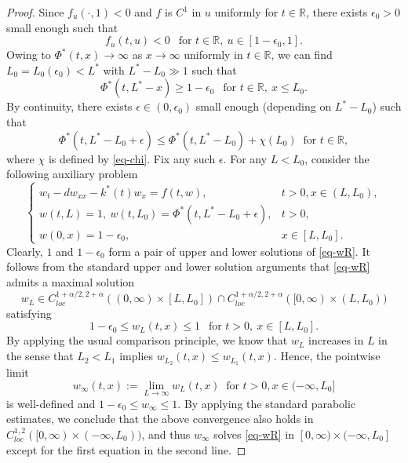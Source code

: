 \documentclass[10pt,a4paper]{amsart}
\begin{document}
\begin{proof}
Since $f_u(\cdot,1)<0$ and $f$ is $C^1$ in $u$ uniformly for $t\in\mathbb R$,  there exists $\epsilon_0>0$ small enough such that  
\begin{equation}\label{eq-f_u}
  f_u(t,u)<0 ~~\text{ for }t\in\mathbb{R},\ u\in[1-\epsilon_0,1].
\end{equation} 
Owing to $\Phi^*(t,x) \to\infty$ as $x\to\infty$ uniformly in $t\in\mathbb R$,   we can find $L_0=L_0(\epsilon_0)<L^*$ with $L^*-L_0\gg 1$  such that 
\begin{equation}\label{eq-pl1}
  \Phi^*(t,L^*-x)\geq 1-\epsilon_0 ~~\text{ for }t\in\mathbb{R},\ x\leq L_0.
\end{equation}
By continuity,  there exists  $\epsilon\in(0,\epsilon_0)$ small enough (depending on $L^*-L_0$) such that
\begin{equation}\label{eq-pchi}
  \Phi^*(t,L^*-L_0+\epsilon)\leq \Phi^*(t,L^*-L_0)+\chi(L_0)~ \text{ for }t\in\mathbb R,
\end{equation}
where $\chi$ is defined by \eqref{eq-chi}.
Fix any such  $\epsilon$. For any $L<L_0$, consider the following auxiliary problem 
\begin{equation}\label{eq-wR}
  \begin{cases}
    w_t-dw_{xx}-k^*(t)w_x=f(t,w), &t>0, x\in(L,L_0),\\
    w(t,L)=1, ~w(t,L_0)=\Phi^*(t,L^*-L_0+\epsilon), &t>0,\\
    w(0,x)=1-\epsilon_0, &x\in[L,L_0].
  \end{cases}
\end{equation}
Clearly, $1$ and $1-\epsilon_0$ form a pair of upper and lower solutions of \eqref{eq-wR}.  It follows from the standard upper and lower solution arguments that \eqref{eq-wR} admits a maximal solution 
$$w_L\in C_{loc}^{1+\alpha/2,2+\alpha}((0,\infty)\times[L,L_0])\cap C_{loc}^{1+\alpha/2,2+\alpha}([0,\infty)\times(L,L_0))$$
 satisfying
\begin{equation}\label{eq-1pw}
 1-\epsilon_0\leq  w_L(t,x)\leq 1 ~~\text{ for }t>0,\ x\in[L,L_0].
\end{equation}
By applying the usual comparison principle, we know that $w_L$ increases in $L$ in the sense that $L_2<L_1$ implies $w_{L_2}(t,x)\leq w_{L_1}(t,x)$. Hence, the pointwise limit
\begin{equation*}
   w_\infty(t,x):=\lim_{L\to\infty}w_L(t,x) \ \mbox{ for } t>0,x\in(-\infty,L_0]
 \end{equation*}
 is well-defined and  $1-\epsilon_0\leq w_\infty\leq 1$. By applying  the standard parabolic estimates, we conclude that the above convergence also holds in $C_{loc}^{1,2}([0,\infty)\times(-\infty,L_0))$,  and thus $w_\infty$ solves \eqref{eq-wR} in $[0,\infty) \times(-\infty,L_0]$  except for the first equation in the second line.

\end{proof}
\end{document}
